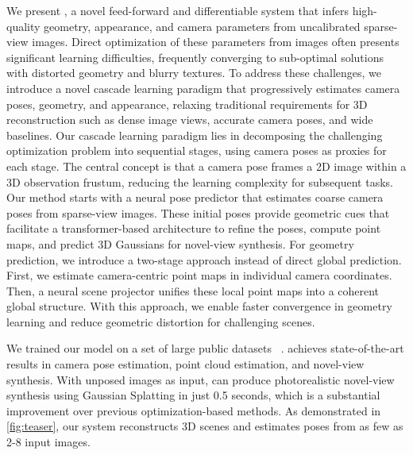 

We present \method, a novel feed-forward and differentiable system that infers high-quality geometry, appearance, and camera parameters from uncalibrated sparse-view images. 
Direct optimization of these parameters from images often presents significant learning difficulties, frequently converging to sub-optimal solutions with distorted geometry and blurry textures. To address these challenges, we introduce a novel cascade learning paradigm that progressively estimates camera poses, geometry, and appearance, relaxing traditional requirements for 3D reconstruction such as dense image views, accurate camera poses, and wide baselines.
%
Our cascade learning paradigm lies in decomposing the challenging  optimization problem into sequential stages, using camera poses as proxies for each stage. 
% 
The central concept is that a camera pose frames a 2D image within a 3D observation frustum, reducing the learning complexity for subsequent tasks. 
% 
Our method starts with a neural pose predictor that estimates coarse camera poses from sparse-view images. These initial poses provide geometric cues that facilitate a transformer-based architecture to refine the poses, compute point maps, and predict 3D Gaussians for novel-view synthesis. 
% 
For geometry prediction, we introduce a two-stage approach instead of direct global prediction. First, we estimate camera-centric point maps in individual camera coordinates. Then, a neural scene projector unifies these local point maps into a coherent global structure. With this approach, we enable faster convergence in geometry learning and reduce geometric distortion for challenging scenes.


We trained our model on a set of large public datasets~\cite{li2018megadepth, baruch2021arkitscenes, yao2020blendedmvs, yeshwanth2023scannet++, Reizenstein2021CommonOI, Sun_2020_CVPR, xia2024rgbd, Ling_2024_CVPR} . \method achieves state-of-the-art results in camera pose estimation, point cloud estimation, and novel-view synthesis. With unposed images as input, \method can produce photorealistic novel-view synthesis using Gaussian Splatting in just 0.5 seconds, which is a substantial improvement over previous optimization-based methods. 
As demonstrated in  \cref{fig:teaser}, our system reconstructs 3D scenes and estimates poses from as few as 2-8 input images.

